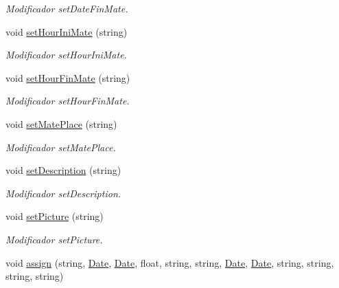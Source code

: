\begin{DoxyCompactItemize}
\begin{DoxyCompactList}\small\item\em Modificador set\+Date\+Fin\+Mate. \end{DoxyCompactList}\item 
void \hyperlink{class_event_afcfecbce4f34e3bbc8c5b9b1143015f5}{set\+Hour\+Ini\+Mate} (string)\hypertarget{class_event_afcfecbce4f34e3bbc8c5b9b1143015f5}{}\label{class_event_afcfecbce4f34e3bbc8c5b9b1143015f5}

\begin{DoxyCompactList}\small\item\em Modificador set\+Hour\+Ini\+Mate. \end{DoxyCompactList}\item 
void \hyperlink{class_event_ad7e81513dcb7b9fddb7f670171b0402c}{set\+Hour\+Fin\+Mate} (string)\hypertarget{class_event_ad7e81513dcb7b9fddb7f670171b0402c}{}\label{class_event_ad7e81513dcb7b9fddb7f670171b0402c}

\begin{DoxyCompactList}\small\item\em Modificador set\+Hour\+Fin\+Mate. \end{DoxyCompactList}\item 
void \hyperlink{class_event_ac2df54c72bf6a913ef8cea23f9164561}{set\+Mate\+Place} (string)\hypertarget{class_event_ac2df54c72bf6a913ef8cea23f9164561}{}\label{class_event_ac2df54c72bf6a913ef8cea23f9164561}

\begin{DoxyCompactList}\small\item\em Modificador set\+Mate\+Place. \end{DoxyCompactList}\item 
void \hyperlink{class_event_a10101412d581dc0a23e6bde775e8330b}{set\+Description} (string)\hypertarget{class_event_a10101412d581dc0a23e6bde775e8330b}{}\label{class_event_a10101412d581dc0a23e6bde775e8330b}

\begin{DoxyCompactList}\small\item\em Modificador set\+Description. \end{DoxyCompactList}\item 
void \hyperlink{class_event_a6ebd602ac071857bc3603713f372af16}{set\+Picture} (string)\hypertarget{class_event_a6ebd602ac071857bc3603713f372af16}{}\label{class_event_a6ebd602ac071857bc3603713f372af16}

\begin{DoxyCompactList}\small\item\em Modificador set\+Picture. \end{DoxyCompactList}\item 
void \hyperlink{class_event_ad2eac077832eb8afa3f03a9eeb885d52}{assign} (string, \hyperlink{class_date}{Date}, \hyperlink{class_date}{Date}, float, string, string, \hyperlink{class_date}{Date}, \hyperlink{class_date}{Date}, string, string, string, string)\hypertarget{class_event_ad2eac077832eb8afa3f03a9eeb885d52}{}\label{class_event_ad2eac077832eb8afa3f03a9eeb885d52}


\end{DoxyCompactItemize}
